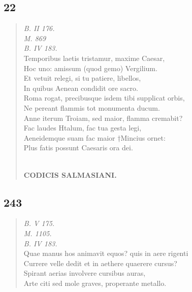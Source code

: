 \documentclass[11pt, a4paper]{report}
\begin{document}
            \subsection*{22}
      \begin{verse}
      \textit{B. II 176.} \\ \textit{M. 869} \\ \textit{B. IV 183.} \\ Temporibus laetis tristamur, maxime Caesar, \\ Hoc uno: amissum (quod gemo) Vergilium. \\ Et vetuit relegi, si tu patiere, libellos, \\ In quibus Aenean condidit ore sacro. \\ Roma rogat, precibusque isdem tibi supplicat orbis, \\ Ne pereant flammis tot monumenta ducum. \\ Anne iterum Troiam, sed maior, flamma cremabit? \\ Fac laudes Htalum, fac tua gesta legi, \\ Aeneidemque suam fac maior †Mincius ornet: \\ Plus fatis possunt Caesaris ora dei. \\ 
        ﻿\pagebreak 
    \begin{center} \textbf{CODICIS SALMASIANI.} \end{center} \marginpar{[199]} 
      \end{verse}
  
            \subsection*{243}
      \begin{verse}
      \textit{B. V 175.} \\ \textit{M. 1105.} \\ \textit{B. IV 183.} \\ Quae manus hos animavit equos? quis in aere rigenti \\ Currere velle dedit et in aethere quaerere cursus? \\ Spirant aerias involvere cursibus auras, \\ Arte citi sed mole graves, properante metallo. \\ 
      \end{verse}
  
\end{document}
